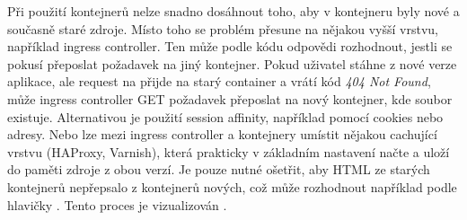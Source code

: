         Při použití kontejnerů nelze snadno dosáhnout toho, aby v kontejneru byly nové a současně staré zdroje. Místo toho se problém přesune na nějakou vyšší vrstvu, například ingress controller. Ten může podle \HTTP kódu odpovědi rozhodnout, jestli se pokusí přeposlat požadavek na jiný kontejner. Pokud uživatel stáhne \HTML z nové verze aplikace, ale request na  přijde na starý container a vrátí kód \textit{404 Not Found}, může ingress controller GET požadavek přeposlat na nový kontejner, kde soubor existuje. Alternativou je použití session affinity, například pomocí cookies nebo  adresy. Nebo lze mezi ingress controller a kontejnery umístit nějakou cachující \HTTP vrstvu (HAProxy, Varnish), která prakticky v základním nastavení načte a uloží do paměti zdroje z obou verzí. Je pouze nutné ošetřit, aby HTML ze starých kontejnerů nepřepsalo \HTML z kontejnerů nových, což může rozhodnout například podle hlavičky . Tento proces je vizualizován .


